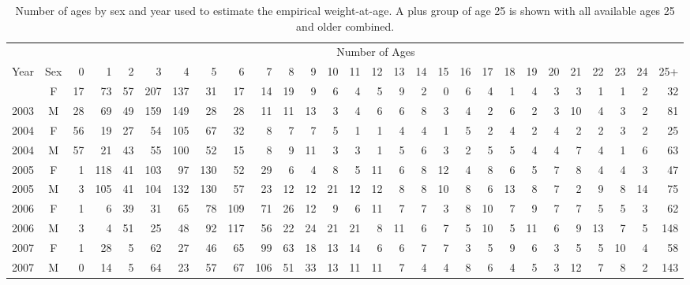 \documentclass[
  english,
]{article}
\begin{document}
\endgroup

\pagebreak

\begin{landscape}

\begingroup
\fontsize{6.0pt}{7.0pt}\selectfont

\begin{longtable}{rcrrrrrrrrrrrrrrrrrrrrrrrrrr}

\caption{\label{tbl-watage-samples}Number of ages by sex and year used
to estimate the empirical weight-at-age. A plus group of age 25 is shown
with all available ages 25 and older combined.}

\tabularnewline

\toprule
 &  & \multicolumn{26}{c}{{Number of Ages}} \\ 
\cmidrule(lr){3-28}
Year & Sex & 0 & 1 & 2 & 3 & 4 & 5 & 6 & 7 & 8 & 9 & 10 & 11 & 12 & 13 & 14 & 15 & 16 & 17 & 18 & 19 & 20 & 21 & 22 & 23 & 24 & 25+ \\ 
\midrule\addlinespace[2.5pt]
2003 & F & 17 & 73 & 57 & 207 & 137 & 31 & 17 & 14 & 19 & 9 & 6 & 4 & 5 & 9 & 2 & 0 & 6 & 4 & 1 & 4 & 3 & 3 & 1 & 1 & 2 & 32 \\ 
2003 & M & 28 & 69 & 49 & 159 & 149 & 28 & 28 & 11 & 11 & 13 & 3 & 4 & 6 & 6 & 8 & 3 & 4 & 2 & 6 & 2 & 3 & 10 & 4 & 3 & 2 & 81 \\ 
2004 & F & 56 & 19 & 27 & 54 & 105 & 67 & 32 & 8 & 7 & 7 & 5 & 1 & 1 & 4 & 4 & 1 & 5 & 2 & 4 & 2 & 4 & 2 & 2 & 3 & 2 & 25 \\ 
2004 & M & 57 & 21 & 43 & 55 & 100 & 52 & 15 & 8 & 9 & 11 & 3 & 3 & 1 & 5 & 6 & 3 & 2 & 5 & 5 & 4 & 4 & 7 & 4 & 1 & 6 & 63 \\ 
2005 & F & 1 & 118 & 41 & 103 & 97 & 130 & 52 & 29 & 6 & 4 & 8 & 5 & 11 & 6 & 8 & 12 & 4 & 8 & 6 & 5 & 7 & 8 & 4 & 4 & 3 & 47 \\ 
2005 & M & 3 & 105 & 41 & 104 & 132 & 130 & 57 & 23 & 12 & 12 & 21 & 12 & 12 & 8 & 8 & 10 & 8 & 6 & 13 & 8 & 7 & 2 & 9 & 8 & 14 & 75 \\ 
2006 & F & 1 & 6 & 39 & 31 & 65 & 78 & 109 & 71 & 26 & 12 & 9 & 6 & 11 & 7 & 7 & 3 & 8 & 10 & 7 & 9 & 7 & 7 & 5 & 5 & 3 & 62 \\ 
2006 & M & 3 & 4 & 51 & 25 & 48 & 92 & 117 & 56 & 22 & 24 & 21 & 21 & 8 & 11 & 6 & 7 & 5 & 10 & 5 & 11 & 6 & 9 & 13 & 7 & 5 & 148 \\ 
2007 & F & 1 & 28 & 5 & 62 & 27 & 46 & 65 & 99 & 63 & 18 & 13 & 14 & 6 & 6 & 7 & 7 & 3 & 5 & 9 & 6 & 3 & 5 & 5 & 10 & 4 & 58 \\ 
2007 & M & 0 & 14 & 5 & 64 & 23 & 57 & 67 & 106 & 51 & 33 & 13 & 11 & 11 & 7 & 4 & 4 & 8 & 6 & 4 & 5 & 3 & 12 & 7 & 8 & 2 & 143 \\ 

\end{longtable}
\end{landscape}
\end{document}
